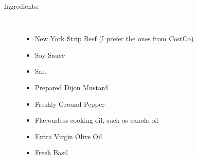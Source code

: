 \documentclass[11pt,letterpaper]{article}
\begin{document}


\begin{description}

\item[Ingredients:]\ \\
	\begin{itemize}
	\item New York Strip Beef (I prefer the ones from CostCo) 
	\item Soy Sauce
	\item Salt
	\item Prepared Dijon Mustard
	\item Freshly Ground Pepper
	\item Flavourless cooking oil, such as canola oil
	\item Extra Virgin Olive Oil
	\item Fresh Basil
	\end{itemize}


\end{description}
\end{document}
